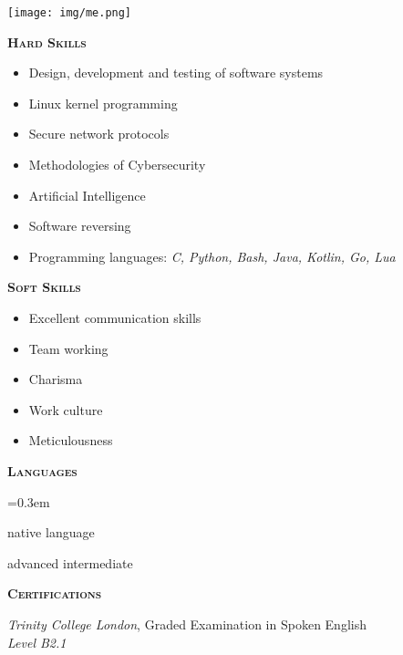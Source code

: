 \documentclass[11pt, a4paper]{article}
\newcommand{\headleft}[1]{\vspace*{5ex}\textsc{\textbf{#1}}\par%
	\vspace*{-1.5ex}\hrulefill\par\vspace*{0.7ex}}
\begin{document}
\setlength{\topskip}{0pt}
\setlength{\parindent}{0pt}
\setlength{\parskip}{0pt}
\setlength{\fboxsep}{0pt}
\pagestyle{empty}
\raggedbottom

\noindent
\begin{minipage}[t]{0.33\textwidth} %
	\colorbox{cvblue}{\color{white}
		\textwidth\relax
		\begin{minipage}[t][298mm][t]{0.82\textwidth}
			\raggedright
			\vspace*{5ex}

			\null\hfill
			\texttt{[image: img/me.png]}
			\hfill\null

			\headleft{Hard Skills}
			\begin{itemize}\itemsep=0.3em
				\item Design, development and testing of
				      software systems
				\item Linux kernel programming
				\item Secure network protocols
				\item Methodologies of Cybersecurity
				\item Artificial Intelligence
				\item Software reversing
				\item Programming languages: \textit{C, Python,
					      Bash, Java, Kotlin, Go, Lua}
			\end{itemize}

			\headleft{Soft Skills}
			\begin{itemize}\itemsep=0.3em
				\item Excellent communication skills
				\item Team working
				\item Charisma
				\item Work culture
				\item Meticulousness
			\end{itemize}

			\headleft{Languages}
			\begin{description}\itemsep=0.3em
				\item[\textsc{Italian}:] native language
				\item[\textsc{English}:] advanced intermediate
			\end{description}

			\headleft{Certifications}
			{\it Trinity College London}, Graded Examination in
			Spoken English \\
			{\it Level B2.1}

		\end{minipage}%
		\textwidth\relax
	}
\end{minipage}
\end{document}
